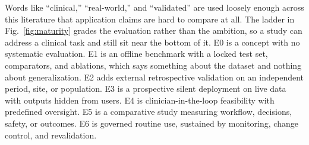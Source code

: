 Words like ``clinical,'' ``real-world,'' and ``validated'' are used loosely enough across this literature that application claims are hard to compare at all. The ladder in Fig.~\ref{fig:maturity} grades the evaluation rather than the ambition, so a study can address a clinical task and still sit near the bottom of it. E0 is a concept with no systematic evaluation. E1 is an offline benchmark with a locked test set, comparators, and ablations, which says something about the dataset and nothing about generalization. E2 adds external retrospective validation on an independent period, site, or population. E3 is a prospective silent deployment on live data with outputs hidden from users. E4 is clinician-in-the-loop feasibility with predefined oversight. E5 is a comparative study measuring workflow, decisions, safety, or outcomes. E6 is governed routine use, sustained by monitoring, change control, and revalidation.

